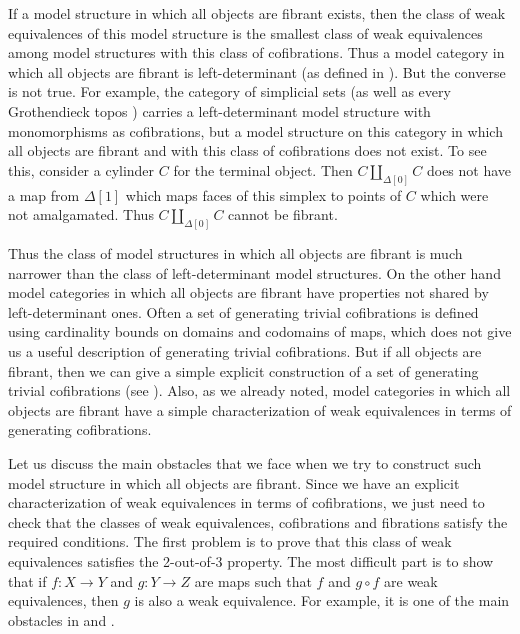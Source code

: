 \documentclass{tac}
\theoremstyle{definition}
\begin{document}
If a model structure in which all objects are fibrant exists, then the class of weak equivalences of this model structure
is the smallest class of weak equivalences among model structures with this class of cofibrations.
Thus a model category in which all objects are fibrant is left-determinant (as defined in \cite{left-det}).
But the converse is not true.
For example, the category of simplicial sets (as well as every Grothendieck topos \cite{cisinski})
carries a left-determinant model structure with monomorphisms as cofibrations,
but a model structure on this category in which all objects are fibrant and with this class of cofibrations does not exist.
To see this, consider a cylinder $C$ for the terminal object.
Then $C \amalg_{\Delta[0]} C$ does not have a map from $\Delta[1]$ which
maps faces of this simplex to points of $C$ which were not amalgamated.
Thus $C \amalg_{\Delta[0]} C$ cannot be fibrant.

Thus the class of model structures in which all objects are fibrant is much narrower than the class of left-determinant model structures.
On the other hand model categories in which all objects are fibrant have properties not shared by left-determinant ones.
Often a set of generating trivial cofibrations is defined using cardinality bounds on domains and codomains of maps,
which does not give us a useful description of generating trivial cofibrations.
But if all objects are fibrant, then we can give a simple explicit construction of a set of generating trivial cofibrations (see ).
Also, as we already noted, model categories in which all objects are fibrant have a simple characterization of weak equivalences in terms of generating cofibrations.

Let us discuss the main obstacles that we face when we try to construct such model structure in which all objects are fibrant.
Since we have an explicit characterization of weak equivalences in terms of cofibrations,
we just need to check that the classes of weak equivalences, cofibrations and fibrations satisfy the required conditions.
The first problem is to prove that this class of weak equivalences satisfies the 2-out-of-3 property.
The most difficult part is to show that if $f : X \to Y$ and $g : Y \to Z$ are maps such that $f$ and $g \circ f$ are weak equivalences, then $g$ is also a weak equivalence.
For example, it is one of the main obstacles in \cite{folk} and \cite{alg-models}.
\end{document}
